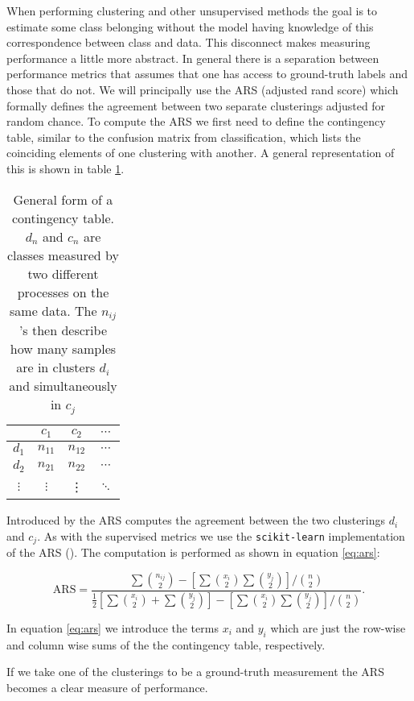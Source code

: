 When performing clustering and other unsupervised methods the goal is to estimate some class belonging without the model having knowledge of this correspondence between class and data. This disconnect makes measuring performance a little more abstract. In general there is a separation between performance metrics that assumes that one has access to ground-truth labels and those that do not. We will principally use the ARS (adjusted rand score) which formally defines the agreement between two separate clusterings adjusted for random chance. To compute the ARS we first need to define the contingency table, similar to the confusion matrix from classification, which lists the coinciding elements of one clustering with another. A general representation of this is shown in table \ref{tab:contingency}. 

\begin{table}
\centering
\begin{tabular}{c|ccc}
& $c_1$ &$c_2$ & $\cdots$\\
\midrule
$d_1$ & $n_{11}$ & $n_{12}$ &  $\cdots$ \\
$d_2$ & $n_{21}$ & $n_{22}$ &  $\cdots$ \\
$\vdots$ & $\vdots$ & \vdots & $\ddots$ \\
\end{tabular}
\caption{General form of a contingency table. $d_n$ and $c_n$ are classes measured by two different processes on the same data. The $n_{ij}$'s then describe how many samples are in clusters $d_i$ and simultaneously in $c_j$}\label{tab:contingency}
\end{table}

Introduced by \cite{Hubert1985} the ARS computes the agreement between the two clusterings $d_i$ and $c_j$. As with the supervised metrics we use the \lstinline{scikit-learn} implementation of the ARS (\cite{Pedregosa2011}). The computation is performed as shown in equation \ref{eq:ars}:

\begin{equation}\label{eq:ars}
\text{ARS} = \frac{\sum  \binom{n_{ij}}{2} - \left[\sum  \binom{x_{i}}{2} \sum  \binom{y_{j}}{2}  \right]/\binom{n}{2}}{\frac{1}{2}\left[\sum  \binom{x_{i}}{2} + \sum  \binom{y_{j}}{2}  \right]- \left[\sum  \binom{x_{i}}{2} \sum  \binom{y_{j}}{2}  \right]/\binom{n}{2}}.
\end{equation}

\noindent In equation \ref{eq:ars} we introduce the terms $x_i$ and $y_i$ which are just the row-wise and column wise sums of the the contingency table, respectively.

If we take one of the clusterings to be a ground-truth measurement the ARS becomes a clear measure of performance. 